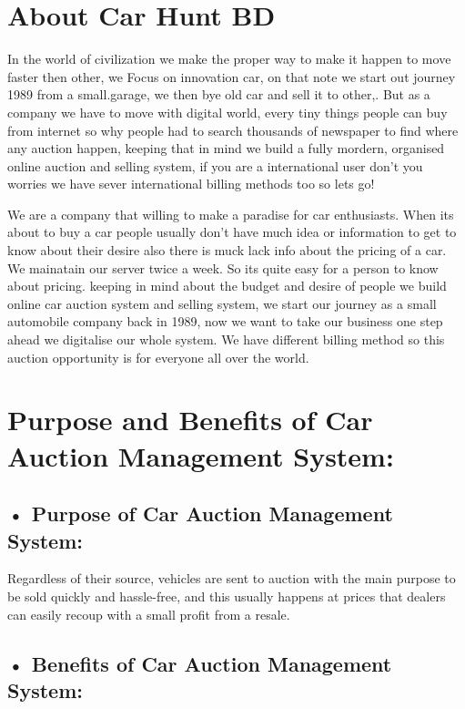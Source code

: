 \documentclass{report}
\begin{document}
\section*{About Car Hunt BD}

In the world of civilization we make the proper way to make it happen to move faster then other, we Focus on innovation car, on that note we start out journey 1989 from a small.garage, we then bye old car and sell it to other,. But as a company we have to move with digital world, every tiny things people can buy from internet so why people had to search thousands of newspaper to find where any auction happen, keeping that in mind we build a fully mordern, organised online auction and selling system, if you are a international user don't you worries we have sever international billing methods too so lets go!



We are a company that willing to make a paradise for car enthusiasts. When its about to buy a car people usually don't have much idea or information to get to know about their desire also there is muck lack info about the pricing of a car. We mainatain our server twice a week. So its quite easy for a person to know about pricing. keeping in mind about the budget and desire of people we build online car auction system and selling system, we start our journey as a small automobile company back in 1989, now we want to take our business one step ahead we digitalise our whole system. We have different billing method so this auction opportunity is for everyone all over the world.


\section*{Purpose and Benefits of Car Auction Management System:}


\subsection*{• Purpose of Car Auction Management System:}


Regardless of their source, vehicles are sent to auction with the main purpose to be sold quickly and hassle-free, and this usually happens at prices that dealers can easily recoup with a small profit from a resale.

\subsection*{• Benefits of Car Auction Management System:}
\end{document}

